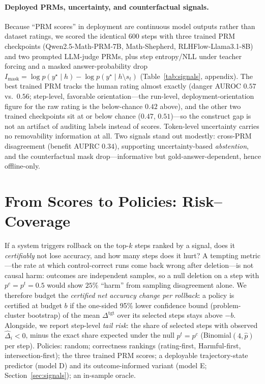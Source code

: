 \documentclass[11pt]{article}
\begin{document}
\paragraph{Deployed PRMs, uncertainty, and counterfactual signals.}
Because ``PRM scores'' in deployment are continuous model outputs rather than dataset ratings, we scored the identical 600 steps with three trained PRM checkpoints (Qwen2.5-Math-PRM-7B, Math-Shepherd, RLHFlow-Llama3.1-8B) and two prompted LLM-judge PRMs, plus step entropy/NLL under teacher forcing and a masked answer-probability drop $I_{\mathrm{mask}} = \log p(y^\star \mid h) - \log p(y^\star \mid h \setminus s_t)$ (Table~\ref{tab:signals}, appendix). The best trained PRM tracks the human rating almost exactly (danger AUROC $0.57$ vs.\ $0.56$; step-level, favorable orientation---the run-level, deployment-orientation figure for the raw rating is the below-chance $0.42$ above), and the other two trained checkpoints sit at or below chance ($0.47$, $0.51$)---so the construct gap is not an artifact of auditing labels instead of scores. Token-level uncertainty carries no removability information at all. Two signals stand out modestly: cross-PRM disagreement (benefit AUPRC $0.34$), supporting uncertainty-based \emph{abstention}, and the counterfactual mask drop---informative but gold-answer-dependent, hence offline-only.

\section{From Scores to Policies: Risk--Coverage}
\label{sec:policy}

If a system triggers rollback on the top-$k$ steps ranked by a signal, does it \emph{certifiably} not lose accuracy, and how many steps does it hurt? A tempting metric---the rate at which control-correct runs come back wrong after deletion---is not causal harm: outcomes are independent samples, so a null deletion on a step with $p^{c}{=}p^{t}{=}0.5$ would show $25\%$ ``harm'' from sampling disagreement alone. We therefore budget the \emph{certified net accuracy change per rollback}: a policy is certified at budget $b$ if the one-sided 95\% lower confidence bound (problem-cluster bootstrap) of the mean $\Delta^{\mathrm{tgt}}$ over its selected steps stays above $-b$. Alongside, we report step-level \emph{tail risk}: the share of selected steps with observed $\hat\Delta_i<0$, minus the exact share expected under the null $p^{t}{=}p^{c}$ (Binomial$(4,\hat p)$ per step). Policies: random; correctness rankings (rating-first, Harmful-first, intersection-first); the three trained PRM scores; a deployable trajectory-state predictor (model D) and its outcome-informed variant (model E; Section~\ref{sec:signals}); an in-sample oracle.
\end{document}
